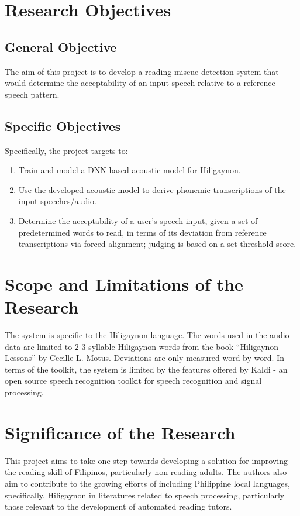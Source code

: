 \section{Research Objectives}
\label{sec:researchobjectives}

\subsection{General Objective}
\label{sec:generalobjective}

The aim of this project is to develop a reading miscue detection system that would determine the acceptability of an input speech relative to a reference speech pattern.

\subsection{Specific Objectives}
\label{sec:specificobjectives}

Specifically, the project targets to:
\begin{enumerate}
   \item Train and model a DNN-based acoustic model for Hiligaynon.
   \item Use the developed acoustic model to derive phonemic transcriptions of the input speeches/audio.
   \item Determine the acceptability of a user's speech input, given a set of predetermined words to read, in terms of its deviation from reference transcriptions via forced alignment; judging is based on a set threshold score.
\end{enumerate}

\section{Scope and Limitations of the Research}
\label{sec:scopelimitations}

The system is specific to the Hiligaynon language. The words used in the audio data are limited to 2-3 syllable Hiligaynon words from the book “Hiligaynon Lessons” by Cecille L. Motus. Deviations are only measured word-by-word. In terms of the toolkit, the system is limited by the features offered by Kaldi - an open source speech recognition toolkit for speech recognition and signal processing.

\section{Significance of the Research}
\label{sec:significance}

This project aims to take one step towards developing a solution for improving the reading skill of Filipinos, particularly non reading adults. The authors also aim to contribute to the growing efforts of including Philippine local languages, specifically, Hiligaynon in literatures related to speech processing, particularly those relevant to the development of automated reading tutors.

